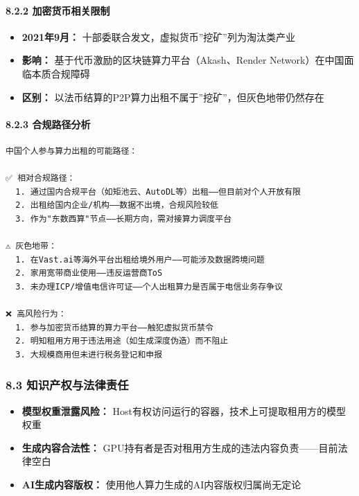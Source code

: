 \documentclass[UTF8,a4paper,12pt]{ctexart}
\begin{document}
\paragraph{8.2.2
加密货币相关限制}\label{ux52a0ux5bc6ux8d27ux5e01ux76f8ux5173ux9650ux5236}

\begin{itemize}
\tightlist
\item
  \textbf{2021年9月：} 十部委联合发文，虚拟货币''挖矿''列为淘汰类产业
\item
  \textbf{影响：} 基于代币激励的区块链算力平台（Akash、Render
  Network）在中国面临本质合规障碍
\item
  \textbf{区别：}
  以法币结算的P2P算力出租不属于''挖矿''，但灰色地带仍然存在
\end{itemize}

\paragraph{8.2.3
合规路径分析}\label{ux5408ux89c4ux8defux5f84ux5206ux6790}

\begin{verbatim}
中国个人参与算力出租的可能路径：

✅ 相对合规路径：
  1. 通过国内合规平台（如矩池云、AutoDL等）出租——但目前对个人开放有限
  2. 出租给国内企业/机构——数据不出境，合规风险较低
  3. 作为"东数西算"节点——长期方向，需对接算力调度平台

⚠️ 灰色地带：
  1. 在Vast.ai等海外平台出租给境外用户——可能涉及数据跨境问题
  2. 家用宽带商业使用——违反运营商ToS
  3. 未办理ICP/增值电信许可证——个人出租算力是否属于电信业务存争议

❌ 高风险行为：
  1. 参与加密货币结算的算力平台——触犯虚拟货币禁令
  2. 明知租用方用于违法用途（如生成深度伪造）而不阻止
  3. 大规模商用但未进行税务登记和申报
\end{verbatim}

\subsubsection{8.3
知识产权与法律责任}\label{ux77e5ux8bc6ux4ea7ux6743ux4e0eux6cd5ux5f8bux8d23ux4efb}

\begin{itemize}
\tightlist
\item
  \textbf{模型权重泄露风险：}
  Host有权访问运行的容器，技术上可提取租用方的模型权重
\item
  \textbf{生成内容合法性：}
  GPU持有者是否对租用方生成的违法内容负责------目前法律空白
\item
  \textbf{AI生成内容版权：} 使用他人算力生成的AI内容版权归属尚无定论
\end{itemize}
\end{document}

